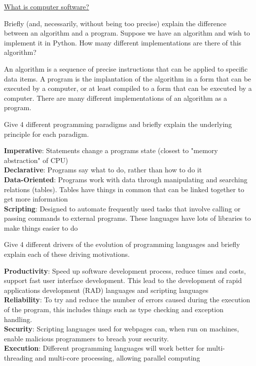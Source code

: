 \documentclass{exam}
\begin{document}
\begin{center}
	\underline{\huge What is computer software?}
\end{center}
\begin{questions}
\question[5]Briefly (and, necessarily, without being too precise) explain the difference
between an algorithm and a program. Suppose we have an
algorithm and wish to implement it in Python. How many different
implementations are there of this algorithm? 
\begin{solution}[2in]
An algorithm is a sequence of precise instructions that can be applied to specific data items. A program is the implantation of the algorithm in a form that can be executed by a computer, or at least compiled to a form that can be executed by a computer. There are many different implementations of an algorithm as a program.
\end{solution}
\question[6]Give 4 different programming paradigms and briefly explain the underlying
principle for each paradigm.
\begin{solution}[2in]
\textbf{Imperative}: Statements change a programs state (closest to "memory abstraction" of CPU)\\
\textbf{Declarative}: Programs say what to do, rather than how to do it\\
\textbf{Data-Oriented}: Programs work with data through manipulating and searching relations (tables). Tables have things in common that can be linked together to get more information\\
\textbf{Scripting}: Designed to automate frequently used tasks that involve calling or passing commands to external programs. These languages have lots of libraries to make things easier to do
\end{solution}

\question[4]Give 4 different drivers of the evolution of programming languages and
briefly explain each of these driving motivations.
\begin{solution}[2in]
\textbf{Productivity}: Speed up software development process, reduce times and costs, support fast user interface development. This lead to the development of rapid applications development (RAD) languages and scripting languages\\
\textbf{Reliability}: To try and reduce the number of errors caused during the execution of the program, this includes things such as type checking and exception handling.\\
\textbf{Security}: Scripting languages used for webpages can, when run on machines, enable malicious programmers to breach your security.\\
\textbf{Execution}: Different programming languages will work better for multi-threading and multi-core processing, allowing parallel computing\\
\end{solution}


\end{questions}
\end{document}
